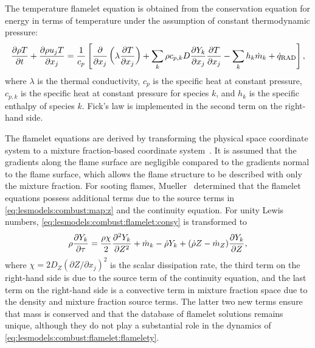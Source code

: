 The temperature flamelet equation is obtained from the conservation equation for energy in terms of temperature under the assumption of constant thermodynamic pressure:
\begin{equation}\label{eq:lesmodels:combust:flamelet:const}
  \trder{T} = \frac{1}{c_p}\left[ \pder[]{x_j}\left( \lambda\pder[T]{x_j} \right) + \sum\limits_{k} \rho c_{p,k} D\pder[Y_k]{x_j}\pder[T]{x_j} - \sum\limits_{k} h_k\dot{m}_k + \dot{q}_{\text{RAD}} \right],
\end{equation}
where $\lambda$ is the thermal conductivity, $c_p$ is the specific heat at constant pressure, $c_{p,k}$ is the specific heat at constant pressure for species $k$, and $h_k$ is the specific enthalpy of species $k$. Fick's law is implemented in the second term on the right-hand side.

The flamelet equations are derived by transforming the physical space coordinate system to a mixture fraction-based coordinate system~\cite{peters1984}. It is assumed that the gradients along the flame surface are negligible compared to the gradients normal to the flame surface, which allows the flame structure to be described with only the mixture fraction. For sooting flames, Mueller~\cite{muellerphd} determined that the flamelet equations possess additional terms due to the source terms in \cref{eq:lesmodels:combust:map:z} and the continuity equation. For unity Lewis numbers, \cref{eq:lesmodels:combust:flamelet:consy} is transformed to
\begin{equation}\label{eq:lesmodels:combust:flamelet:flamelety}
  \rho\pder[Y_k]{\tau} = \frac{\rho\chi}{2}\sder[Y_k]{Z} + \dot{m}_k - \dot{\rho}Y_k + (\dot{\rho}Z - \dot{m}_Z)\pder[Y_k]{Z},
\end{equation}
where $\chi = 2D_Z(\partial Z/\partial x_j)^2$ is the scalar dissipation rate, the third term on the right-hand side is due to the source term of the continuity equation, and the last term on the right-hand side is a convective term in mixture fraction space due to the density and mixture fraction source terms. The latter two new terms ensure that mass is conserved and that the database of flamelet solutions remains unique, although they do not play a substantial role in the dynamics of \cref{eq:lesmodels:combust:flamelet:flamelety}.

